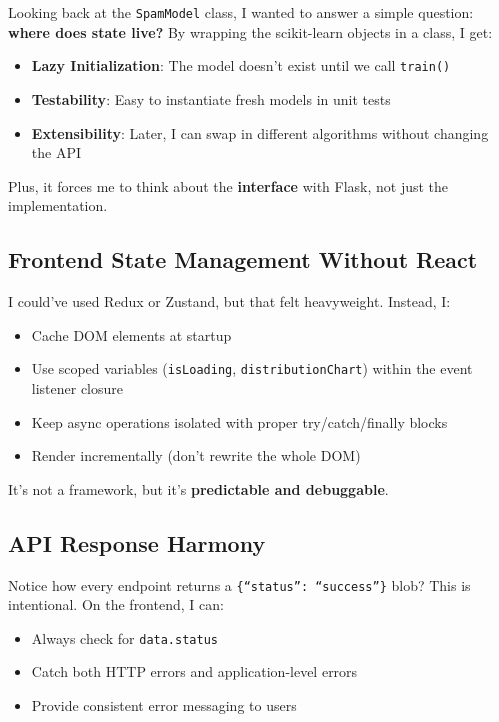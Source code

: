 \documentclass[12pt, a4paper]{article}
\begin{document}
Looking back at the \texttt{SpamModel} class, I wanted to answer a simple question: \textbf{where does state live?} By wrapping the scikit-learn objects in a class, I get:

\begin{itemize}
    \item \textbf{Lazy Initialization}: The model doesn't exist until we call \texttt{train()}
    \item \textbf{Testability}: Easy to instantiate fresh models in unit tests
    \item \textbf{Extensibility}: Later, I can swap in different algorithms without changing the API
\end{itemize}

Plus, it forces me to think about the \textbf{interface} with Flask, not just the implementation.

\subsection{Frontend State Management Without React}

I could've used Redux or Zustand, but that felt heavyweight. Instead, I:

\begin{itemize}
    \item Cache DOM elements at startup
    \item Use scoped variables (\texttt{isLoading}, \texttt{distributionChart}) within the event listener closure
    \item Keep async operations isolated with proper try/catch/finally blocks
    \item Render incrementally (don't rewrite the whole DOM)
\end{itemize}

It's not a framework, but it's \textbf{predictable and debuggable}.

\subsection{API Response Harmony}

Notice how every endpoint returns a \texttt{\{``status'': ``success''\}} blob? This is intentional. On the frontend, I can:

\begin{itemize}
    \item Always check for \texttt{data.status}
    \item Catch both HTTP errors and application-level errors
    \item Provide consistent error messaging to users
\end{itemize}
\end{document}
